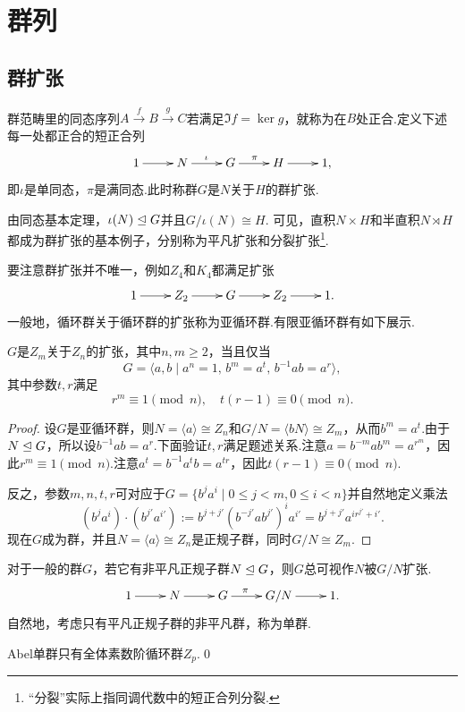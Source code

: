\section{群列}
\subsection{群扩张}\label{subsec:GroupExtension}
群范畴里的同态序列$A\overset{f}{\to} B\overset{g}{\to} C$若满足$\Im f=\ker g$，就称为在$B$处{\heiti 正合}.定义下述每一处都正合的{\heiti 短正合列}
\[
	\xymatrix{
		1\ar[r]&N\ar[r]^\iota&G\ar[r]^\pi&H\ar[r]&1,
	}
\]
即$\iota$是单同态，$\pi$是满同态.此时称群$G$是$N$关于$H$的{\heiti 群扩张}.

由同态基本定理，$\iota(N)\trianglelefteq G$并且$G/\iota(N)\cong H$.
可见，直积$N\times H$和半直积$N\rtimes H$都成为群扩张的基本例子，分别称为{\heiti 平凡扩张}和{\heiti 分裂扩张}\footnote{“分裂”实际上指同调代数中的短正合列分裂.}.

要注意群扩张并不唯一，例如$Z_4$和$K_4$都满足扩张
\[
	\xymatrix{
		1\ar[r]&Z_2\ar[r]&G\ar[r]&Z_2\ar[r]&1.
	}
\]
一般地，循环群关于循环群的扩张称为{\heiti 亚循环群}.有限亚循环群有如下展示.
\begin{thm}[(H\"older)]
	$G$是$Z_m$关于$Z_n$的扩张，其中$n,m\ge 2$，当且仅当
	\[
		G=\langle a,b\mid a^n=1,\,b^m=a^t,\,b^{-1}ab=a^r\rangle ,
	\]
	其中参数$t,r$满足
	\[
		r^m\equiv 1\pmod{n},\quad t(r-1)\equiv 0\pmod{n}.
	\]
\end{thm}
\begin{proof}
	设$G$是亚循环群，则$N=\langle a\rangle\cong Z_n$和$G/N=\langle bN\rangle \cong Z_m$，从而$b^m=a^t$.由于$N\trianglelefteq G$，所以设$b^{-1}ab=a^r$.下面验证$t,r$满足题述关系.注意$a=b^{-m}ab^m=a^{r^m}$，因此$r^m\equiv 1\pmod n$.注意$a^t=b^{-1}a^tb=a^{tr}$，因此$t(r-1)\equiv 0\pmod n$.

	反之，参数$m,n,t,r$可对应于$G=\{b^ja^i\mid 0\le j<m,0\le i<n\}$并自然地定义乘法
	\[
		(b^ja^i)\cdot (b^{j'}a^{i'}):=b^{j+j'}(b^{-j'}ab^{j'})^ia^{i'}=b^{j+j'}a^{ir^{j'}+i'}.
	\]
	现在$G$成为群，并且$N=\langle a\rangle\cong Z_n$是正规子群，同时$G/N\cong Z_m$.
\end{proof}

对于一般的群$G$，若它有非平凡正规子群$N\trianglelefteq G$，则$G$总可视作$N$被$G/N$扩张.
\[
	\xymatrix{
		1\ar[r]&N\ar[r]&G\ar[r]^(0.4)\pi&G/N\ar[r]&1.
	}
\]
自然地，考虑只有平凡正规子群的非平凡群，称为{\heiti 单群}.\hypertarget{text:Simple}{}

\begin{prop}
	Abel单群只有全体素数阶循环群$Z_p$.\qed
\end{prop}

